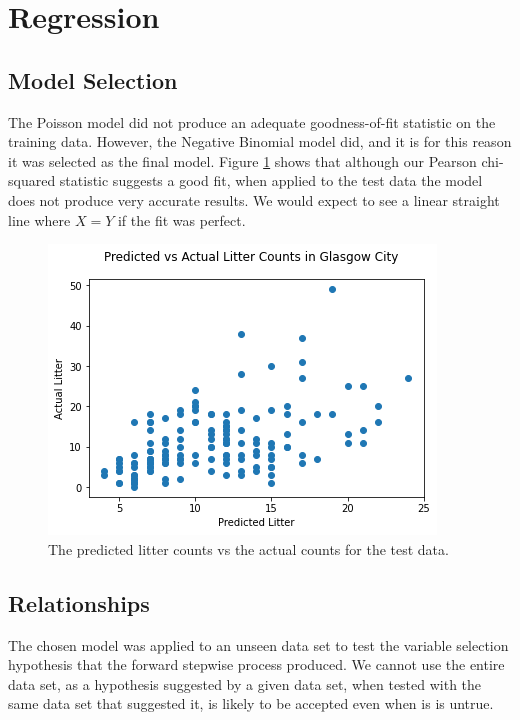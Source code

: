 \documentclass{thesis}
\begin{document}
\newpage
\section{Regression}

\subsection{Model Selection}

The Poisson model did not produce an adequate goodness-of-fit statistic on the training data. However, the Negative Binomial model did, and it is for this reason it was selected as the final model. Figure \ref{fig:predicted-vs-actual-test} shows that although our Pearson chi-squared statistic suggests a good fit, when applied to the test data the model does not produce very accurate results. We would expect to see a linear straight line where $X = Y$ if the fit was perfect.

\begin{figure}[h!]
    \centering
    \includegraphics[scale=0.6]{images/predicted-vs-actual-test.png}
    \caption{The predicted litter counts vs the actual counts for the test data.}
    \label{fig:predicted-vs-actual-test}
\end{figure}

\subsection{Relationships}

The chosen model was applied to an unseen data set to test the variable selection hypothesis that the forward stepwise process produced. We cannot use the entire data set, as a hypothesis suggested by a given data set, when tested with the same data set that suggested it, is likely to be accepted even when is is untrue\cite{testing-hyp-wikipedia}.
\end{document}
